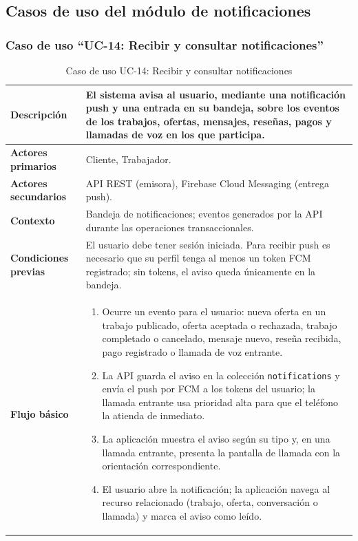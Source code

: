 \documentclass[doc,12pt,a4paper]{apa7}
\begin{document}

\subsection{Casos de uso del módulo de notificaciones}

\subsubsection{Caso de uso ``UC-14: Recibir y consultar notificaciones''}

\begin{longtable}{|P{3.3cm}|L{11.2cm}|}
\caption{Caso de uso UC-14: Recibir y consultar notificaciones}\\
\hline
\textbf{Descripción} & El sistema avisa al usuario, mediante una notificación push y una entrada en su bandeja, sobre los eventos de los trabajos, ofertas, mensajes, reseñas, pagos y llamadas de voz en los que participa. \\ \hline
\textbf{Actores primarios} & Cliente, Trabajador. \\ \hline
\textbf{Actores secundarios} & API REST (emisora), Firebase Cloud Messaging (entrega push). \\ \hline
\textbf{Contexto} & Bandeja de notificaciones; eventos generados por la API durante las operaciones transaccionales. \\ \hline
\textbf{Condiciones previas} & El usuario debe tener sesión iniciada. Para recibir push es necesario que su perfil tenga al menos un token FCM registrado; sin tokens, el aviso queda únicamente en la bandeja. \\ \hline
\textbf{Flujo básico} &
\begin{enumerate}
    \item Ocurre un evento para el usuario: nueva oferta en un trabajo publicado, oferta aceptada o rechazada, trabajo completado o cancelado, mensaje nuevo, reseña recibida, pago registrado o llamada de voz entrante.
    \item La API guarda el aviso en la colección \texttt{notifications} y envía el push por FCM a los tokens del usuario; la llamada entrante usa prioridad alta para que el teléfono la atienda de inmediato.
    \item La aplicación muestra el aviso según su tipo y, en una llamada entrante, presenta la pantalla de llamada con la orientación correspondiente.
    \item El usuario abre la notificación; la aplicación navega al recurso relacionado (trabajo, oferta, conversación o llamada) y marca el aviso como leído.

\end{enumerate}
\end{longtable}
\end{document}
